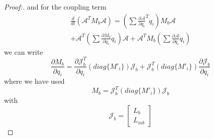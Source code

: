 \documentclass[lettersize,journal]{IEEEtran}
\def \A {\mathcal{A}}
\theoremstyle{remark}
\begin{document}
\begin{proof}[Proof:]

and for the coupling term
\begin{multline}
    {\frac{d}{dt}(\A^TM_b\A)}=(\sum\frac{\partial \A}{\partial{q}_i}^T{}\dot{q}_i)M_b\A\\
    +\A^T(\sum\frac{\partial M_b}{\partial{q}_i}\dot{q}_i)\A+ \A^TM_b(\sum\frac{\partial \A}{\partial{q}_i}\dot{q}_i)
\end{multline}
we can write
\begin{equation}
 \frac{\partial M_b}{\partial q_i}
=
\frac{\partial\mathcal{J}_b^T}{\partial q_i} (diag\{M'_i\})\mathcal{J}_b+\mathcal{J}_b^T(diag\{M'_i\})\frac{\partial \mathcal{J}_b}{\partial q_i}%
\end{equation}
where we have used
\begin{equation}
    M_b=\mathcal{J}_b^T(diag\{{M}'_i\})\mathcal{J}_b
\end{equation}
with
\begin{equation}
    \mathcal{J}_b=\begin{bmatrix}L_b \\ L_{mb}\end{bmatrix}
\end{equation}



\end{proof}
\end{document}
